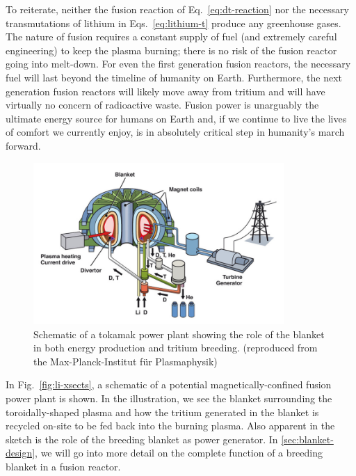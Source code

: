 To reiterate, neither the fusion reaction of Eq.~\ref{eq:dt-reaction} nor the necessary transmutations of lithium in Eqs.~\ref{eq:lithium-t} produce any greenhouse gases. The nature of fusion requires a constant supply of fuel (and extremely careful engineering) to keep the plasma burning; there is no risk of the fusion reactor going into melt-down. For even the first generation fusion reactors, the necessary fuel will last beyond the timeline of humanity on Earth. Furthermore, the next generation fusion reactors will likely move away from tritium and will have virtually no concern of radioactive waste. Fusion power is unarguably the ultimate energy source for humans on Earth and, if we continue to live the lives of comfort we currently enjoy, is in absolutely critical step in humanity's march forward.

\begin{figure}
	\centering
	\includegraphics[width=0.85\textwidth]{chapters/figures/power-plant-schematic} 
	\caption{Schematic of a tokamak power plant showing the role of the blanket in both energy production and tritium breeding. (reproduced from the Max-Planck-Institut für Plasmaphysik)}
	\label{fig:power-plant-schematic}
\end{figure}

In Fig.~\ref{fig:li-xsects}, a schematic of a potential magnetically-confined fusion power plant is shown. In the illustration, we see the blanket surrounding the toroidally-shaped plasma and how the tritium generated in the blanket is recycled on-site to be fed back into the burning plasma. Also apparent in the sketch is the role of the breeding blanket as power generator. In \cref{sec:blanket-design}, we will go into more detail on the complete function of a breeding blanket in a fusion reactor.
